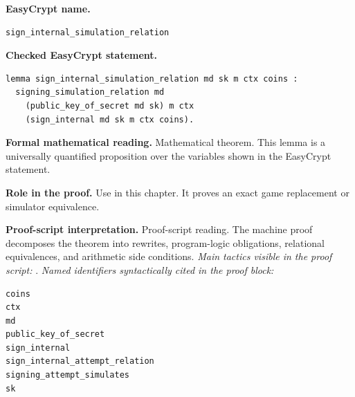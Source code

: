 \begin{formaltheorem}
\noindent\textbf{EasyCrypt name.}
\begin{lstlisting}[language=EasyCrypt,basicstyle=\ttfamily\scriptsize]
sign_internal_simulation_relation
\end{lstlisting}
\noindent\textbf{Checked EasyCrypt statement.}
\begin{lstlisting}[language=EasyCrypt,basicstyle=\ttfamily\scriptsize]
lemma sign_internal_simulation_relation md sk m ctx coins :
  signing_simulation_relation md
    (public_key_of_secret md sk) m ctx
    (sign_internal md sk m ctx coins).
\end{lstlisting}
\noindent\textbf{Formal mathematical reading.}
Mathematical theorem. This lemma is a universally quantified proposition over the variables shown in the EasyCrypt statement.

\noindent\textbf{Role in the proof.}
Use in this chapter. It proves an exact game replacement or simulator equivalence.

\noindent\textbf{Proof-script interpretation.}
Proof-script reading. The machine proof decomposes the theorem into rewrites, program-logic obligations, relational equivalences, and arithmetic side conditions.
\emph{Main tactics visible in the proof script:} .
\emph{Named identifiers syntactically cited in the proof block:}
\begin{lstlisting}[language=EasyCrypt,basicstyle=\ttfamily\scriptsize]
coins
ctx
md
public_key_of_secret
sign_internal
sign_internal_attempt_relation
signing_attempt_simulates
sk
\end{lstlisting}

\end{formaltheorem}

